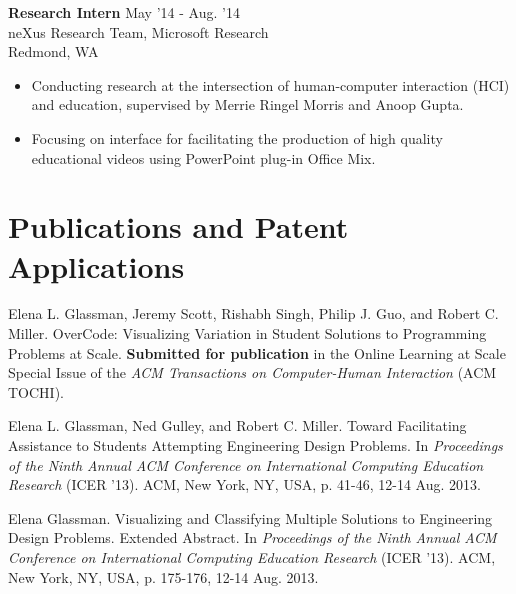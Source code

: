 \documentclass[margin]{res}
\begin{document}
\begin{resume}
{\bf Research Intern} \hfill May '14 - Aug. '14 \\ neXus Research Team, Microsoft Research \\ Redmond, WA 
 \begin{itemize} \itemsep -2pt  %
 \item Conducting research at the intersection of human-computer interaction (HCI) and education, supervised by Merrie Ringel Morris and Anoop Gupta. 
 \item Focusing on interface for facilitating the production of high quality educational videos using PowerPoint plug-in Office Mix.

\end{itemize}
 
\section{Publications and Patent Applications}


Elena L. Glassman, Jeremy Scott, Rishabh Singh, Philip J. Guo, and Robert C. Miller. OverCode: Visualizing Variation in Student Solutions to Programming Problems at Scale. {\bf Submitted for publication} in the Online Learning at Scale Special Issue of the {\it ACM Transactions on Computer-Human Interaction} (ACM TOCHI).

Elena L. Glassman, Ned Gulley, and Robert C. Miller. Toward Facilitating Assistance to Students Attempting Engineering Design Problems. In {\it Proceedings of the Ninth Annual ACM Conference on International Computing Education Research} (ICER '13). ACM, New York, NY, USA, p. 41-46, 12-14 Aug. 2013.


Elena Glassman. Visualizing and Classifying Multiple Solutions to Engineering Design Problems. Extended Abstract. In {\it Proceedings of the Ninth Annual ACM Conference on International Computing Education Research} (ICER '13). ACM, New York, NY, USA, p. 175-176, 12-14 Aug. 2013.


\end{resume}
\end{document}
